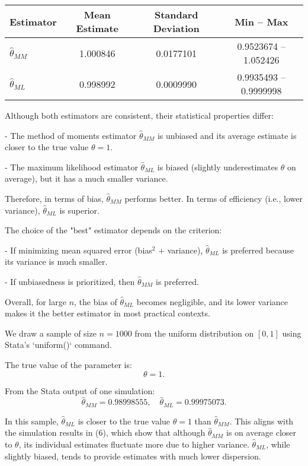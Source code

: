 \documentclass{article}
\begin{document}
\begin{center}
\begin{tabular}{lccc}
\hline
Estimator & Mean Estimate & Standard Deviation & Min -- Max \\
\hline
$\hat{\theta}_{MM}$ & 1.000846 & 0.0177101 & 0.9523674 -- 1.052426 \\
$\hat{\theta}_{ML}$ & 0.998992 & 0.0009990 & 0.9935493 -- 0.9999998 \\
\hline
\end{tabular}
\end{center}

Although both estimators are consistent, their statistical properties differ:

- The method of moments estimator $\hat{\theta}_{MM}$ is unbiased and its average estimate is closer to the true value $\theta = 1$.

- The maximum likelihood estimator $\hat{\theta}_{ML}$ is biased (slightly underestimates $\theta$ on average), but it has a much smaller variance.

Therefore, in terms of bias, $\hat{\theta}_{MM}$ performs better. In terms of efficiency (i.e., lower variance), $\hat{\theta}_{ML}$ is superior. 

The choice of the "best" estimator depends on the criterion:

- If minimizing mean squared error (bias$^2$ + variance), $\hat{\theta}_{ML}$ is preferred because its variance is much smaller.

- If unbiasedness is prioritized, then $\hat{\theta}_{MM}$ is preferred.

Overall, for large $n$, the bias of $\hat{\theta}_{ML}$ becomes negligible, and its lower variance makes it the better estimator in most practical contexts.

\vspace{1em}

We draw a sample of size $n = 1000$ from the uniform distribution on $[0,1]$ using Stata's `uniform()` command.

The true value of the parameter is:
\[
\theta = 1.
\]

From the Stata output of one simulation:
\[
\hat{\theta}_{MM} = 0.98998555, \quad \hat{\theta}_{ML} = 0.99975073.
\]

In this sample, $\hat{\theta}_{ML}$ is closer to the true value $\theta = 1$ than $\hat{\theta}_{MM}$. This aligns with the simulation results in (6), which show that although $\hat{\theta}_{MM}$ is on average closer to $\theta$, its individual estimates fluctuate more due to higher variance. $\hat{\theta}_{ML}$, while slightly biased, tends to provide estimates with much lower dispersion.
\end{document}
